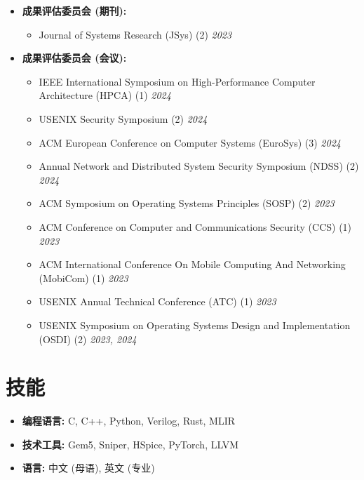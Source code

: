 \documentclass{resume}
\begin{document}
\begin{itemize}[itemsep=1pt, topsep=2pt, leftmargin=*]
    \item \textbf{成果评估委员会 (期刊):}
        \begin{itemize}[label={}, leftmargin=1em, itemsep=0pt]
            \item Journal of Systems Research (JSys) (2) \hfill \textit{2023}
        \end{itemize}
    \item \textbf{成果评估委员会 (会议):}
        \begin{itemize}[label={}, leftmargin=1em, itemsep=0pt]
            \item IEEE International Symposium on High-Performance Computer Architecture (HPCA) (1) \hfill \textit{2024}
            \item USENIX Security Symposium (2) \hfill \textit{2024}
            \item ACM European Conference on Computer Systems (EuroSys) (3) \hfill \textit{2024}
            \item Annual Network and Distributed System Security Symposium (NDSS) (2) \hfill \textit{2024}
            \item ACM Symposium on Operating Systems Principles (SOSP) (2) \hfill \textit{2023}
            \item ACM Conference on Computer and Communications Security (CCS) (1) \hfill \textit{2023}
            \item ACM International Conference On Mobile Computing And Networking (MobiCom) (1) \hfill \textit{2023}
            \item USENIX Annual Technical Conference (ATC) (1) \hfill \textit{2023}
            \item USENIX Symposium on Operating Systems Design and Implementation (OSDI) (2) \hfill \textit{2023, 2024}
        \end{itemize}
\end{itemize}

\section{技能}
\begin{itemize}[parsep=0.5ex]
    \item \textbf{编程语言:} C, C++, Python, Verilog, Rust, MLIR
    \item \textbf{技术工具:} Gem5, Sniper, HSpice, PyTorch, LLVM
    \item \textbf{语言:} 中文 (母语), 英文 (专业)
\end{itemize}
\end{document}
